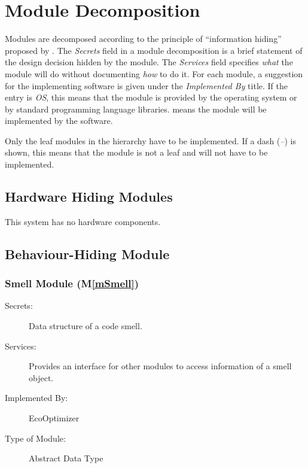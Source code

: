 \documentclass[12pt, titlepage]{article}
\newcommand{\mref}[1]{M\ref{#1}}
\begin{document}

\section{Module Decomposition} \label{SecMD}

Modules are decomposed according to the principle of ``information hiding''
proposed by \citet{ParnasEtAl1984}. The \emph{Secrets} field in a module
decomposition is a brief statement of the design decision hidden by the
module. The \emph{Services} field specifies \emph{what} the module will do
without documenting \emph{how} to do it. For each module, a suggestion for the
implementing software is given under the \emph{Implemented By} title. If the
entry is \emph{OS}, this means that the module is provided by the operating
system or by standard programming language libraries.  \emph{\progname{}} means the
module will be implemented by the \progname{} software.

Only the leaf modules in the hierarchy have to be implemented. If a dash
(\emph{--}) is shown, this means that the module is not a leaf and will not have
to be implemented.

\subsection{Hardware Hiding Modules}

This system has no hardware components.

\subsection{Behaviour-Hiding Module}

\subsubsection{Smell Module (\mref{mSmell})}

\begin{description}
\item[Secrets:] Data structure of a code smell.
\item[Services:] Provides an interface for other modules to access information of a smell object.
\item[Implemented By:] EcoOptimizer
\item[Type of Module:] Abstract Data Type
\end{description}
\end{document}
